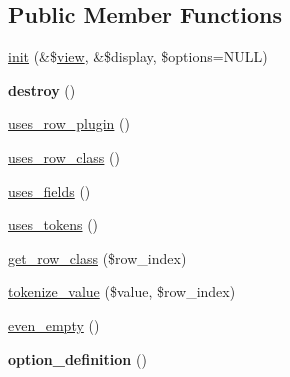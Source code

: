 \subsection*{Public Member Functions}
\begin{DoxyCompactItemize}
\item 
\hyperlink{classviews__plugin__style_ab48326b2ea3d9bd9ad5fdf4f544c8eed}{init} (\&\$\hyperlink{classview}{view}, \&\$display, \$options=NULL)
\item 
\hypertarget{classviews__plugin__style_a0197e61c10e03cfc78f823db2ce8b620}{
{\bfseries destroy} ()}
\label{classviews__plugin__style_a0197e61c10e03cfc78f823db2ce8b620}

\item 
\hyperlink{classviews__plugin__style_a92ca48fa0359e70572f9a226ac54697f}{uses\_\-row\_\-plugin} ()
\item 
\hyperlink{classviews__plugin__style_a2a23b833fd7a5905eba7942c6ccd6d6f}{uses\_\-row\_\-class} ()
\item 
\hyperlink{classviews__plugin__style_a04c6419f4049b7e2644904b5089f2e41}{uses\_\-fields} ()
\item 
\hyperlink{classviews__plugin__style_a7d790501a0aa53283e61cffbd59afb9e}{uses\_\-tokens} ()
\item 
\hyperlink{classviews__plugin__style_aa593397b4581d85a413699d7a084b663}{get\_\-row\_\-class} (\$row\_\-index)
\item 
\hyperlink{classviews__plugin__style_a64c88c0e4d26997edce0478df01983c0}{tokenize\_\-value} (\$value, \$row\_\-index)
\item 
\hyperlink{classviews__plugin__style_af9009e2a5f50ea90d9f02adeba4b711c}{even\_\-empty} ()
\item 
\hypertarget{classviews__plugin__style_a95b6f2eadf403ff36f1ff2860294b3c2}{
{\bfseries option\_\-definition} ()}
\label{classviews__plugin__style_a95b6f2eadf403ff36f1ff2860294b3c2}


\end{DoxyCompactItemize}
